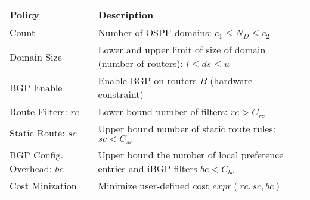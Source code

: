 \begin{table}[!t]
\begin{small}
	\begin{center}
		\begin{tabular}{m{6.5em}  m{17.7em} } 
			{\bf Policy} & {\bf Description} \\ 
			\hline
			Count  & Number of OSPF domains: $c_1\leq N_D\leq c_2$  \\ \hline
			Domain Size  & Lower and upper
			limit of size of domain (number of routers): $l\leq ds\leq u$ \\ \hline
			BGP \newline Enable & Enable BGP on routers $B$ (hardware constraint) \\ \hline
			Route-Filters: $rc$ & Lower bound number of filters:
			$rc > C_{rc}$\\ \hline
			Static Route: ${sc}$ & Upper bound number of static route rules: $sc < C_{sc}$ \\ \hline
			BGP Config. Overhead: $bc$ & Upper bound the number of local preference entries and iBGP filters $bc < C_{bc}$ \\ \hline
			Cost Minization & Minimize user-defined cost $expr(rc, sc, bc)$
		\end{tabular}
	\end{center}
	 \label{tab:configpolicysupport} 
\end{small}
\end{table}
